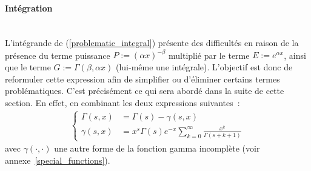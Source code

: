 \paragraph{Intégration}\phantom{}\\
L'intégrande de (\ref{problematic_integral}) présente des difficultés en raison de la présence du terme puissance $P:={(\alpha x)}^{-\beta}$ multiplié par le terme $E:=e^{\alpha x}$, ainsi que le terme $G:=\Gamma(\beta, \alpha x)$ (lui-même une intégrale). L'objectif est donc de reformuler cette expression afin de simplifier ou d'éliminer certains termes problématiques. C'est précisément ce qui sera abordé dans la suite de cette section. En effet, en combinant les deux expressions suivantes~\cite{NIST:DLMF}: 
\begin{align*}
    \left\{
    \begin{aligned}
        \Gamma(s,x) &= \Gamma(s)-\gamma(s,x) \\
        \gamma(s,x) &= x^s\Gamma(s)e^{-x}\sum_{k=0}^{\infty} \frac{x^k}{\Gamma(s+k+1)}
    \end{aligned}
    \right.
\end{align*}
avec $\gamma(\cdot,\cdot)$ une autre forme de la fonction gamma incomplète (voir annexe~\ref{special_functions}). 

